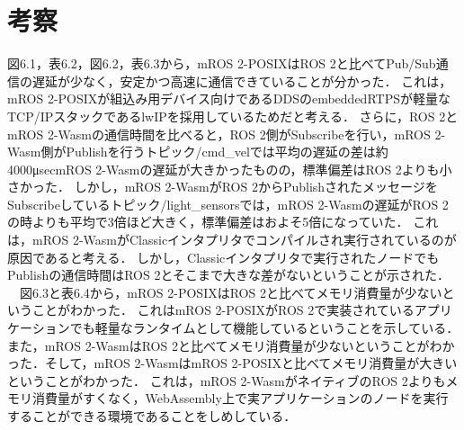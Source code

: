 \section{考察}
図6.1，表6.2，図6.2，表6.3から，mROS 2-POSIXはROS 2と比べてPub/Sub通信の遅延が少なく，安定かつ高速に通信できていることが分かった．
これは，mROS 2-POSIXが組込み用デバイス向けであるDDSのembeddedRTPSが軽量なTCP/IPスタックであるlwIPを採用しているためだと考える．
さらに，ROS 2とmROS 2-Wasmの通信時間を比べると，ROS 2側がSubscribeを行い，mROS 2-Wasm側がPublishを行うトピック/cmd\_velでは平均の遅延の差は約4000μsecmROS 2-Wasmの遅延が大きかったものの，標準偏差はROS 2よりも小さかった．
しかし，mROS 2-WasmがROS 2からPublishされたメッセージをSubscribeしているトピック/light\_sensorsでは，mROS 2-Wasmの遅延がROS 2の時よりも平均で3倍ほど大きく，標準偏差はおよそ5倍になっていた．
これは，mROS 2-WasmがClassicインタプリタでコンパイルされ実行されているのが原因であると考える．
しかし，Classicインタプリタで実行されたノードでもPublishの通信時間はROS 2とそこまで大きな差がないということが示された．
\\　図6.3と表6.4から，mROS 2-POSIXはROS 2と比べてメモリ消費量が少ないということがわかった．
これはmROS 2-POSIXがROS 2で実装されているアプリケーションでも軽量なランタイムとして機能しているということを示している．
また，mROS 2-WasmはROS 2と比べてメモリ消費量が少ないということがわかった．そして，mROS 2-WasmはmROS 2-POSIXと比べてメモリ消費量が大きいということがわかった．
これは，mROS 2-WasmがネイティブのROS 2よりもメモリ消費量がすくなく，WebAssembly上で実アプリケーションのノードを実行することができる環境であることをしめしている．

